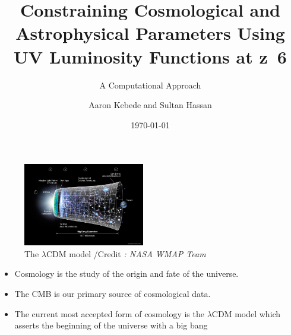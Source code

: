 \documentclass[10pt,t]{beamer}
\title{Constraining Cosmological and Astrophysical Parameters Using UV Luminosity Functions at z~6}
\subtitle{A Computational Approach}
\author{Aaron Kebede and Sultan Hassan}
\institute{\href{https://lehigh.edu/agk223}{Lehigh University / Flatiron CCA}}
\date{\today}
\begin{document}
\begin{frame}
  \titlepage
\end{frame}

\begin{frame}[c]
\begin{figure}
\includegraphics[width=200]{images/lambda.jpg}
\caption{The $\lambda$CDM model /Credit \textit{: NASA WMAP Team} }
  \label{fig: lambda CDM model}
\end{figure}
  \begin{itemize}
    \item Cosmology is the study of the origin and fate of the universe.
    \item The CMB is our primary source of cosmological data.
    \item The current most accepted form of cosmology is the $\lambda$CDM model which asserts the beginning of the universe with a big bang
  \end{itemize}
\end{frame}
\end{document}
